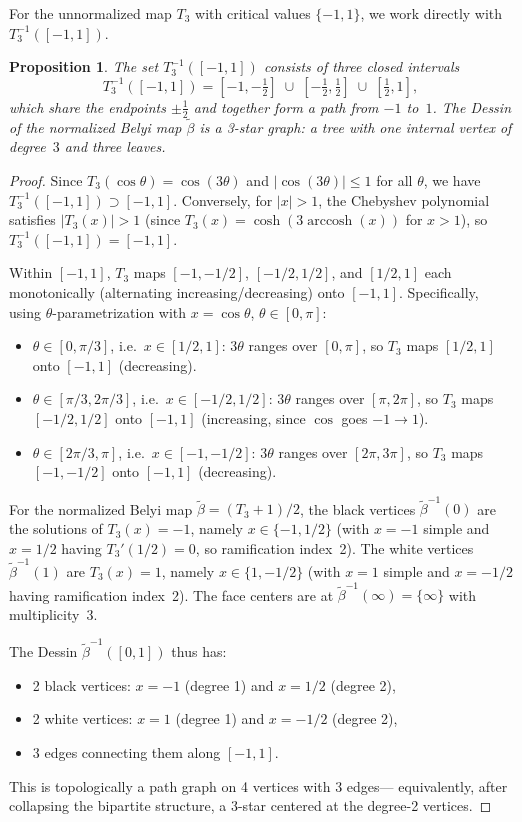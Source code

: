 \documentclass[12pt]{amsart}
\newtheorem{proposition}[theorem]{Proposition}
\theoremstyle{definition}
\theoremstyle{remark}
\begin{document}
For the unnormalized map $T_3$ with critical values $\{-1,1\}$, we
work directly with $T_3^{-1}([-1,1])$.

\begin{proposition}\label{prop:dessin-T3}
The set $T_3^{-1}([-1,1])$ consists of three closed intervals
\[
  T_3^{-1}([-1,1]) = [-1, -\tfrac{1}{2}] \;\cup\; [-\tfrac{1}{2}, \tfrac{1}{2}]
                      \;\cup\; [\tfrac{1}{2}, 1],
\]
which share the endpoints $\pm\tfrac{1}{2}$ and together form a path
from $-1$ to~$1$.  The Dessin of the normalized Belyi map $\tilde{\beta}$
is a 3-star graph: a tree with one internal vertex of degree~$3$ and
three leaves.
\end{proposition}

\begin{proof}
Since $T_3(\cos\theta) = \cos(3\theta)$ and $|\cos(3\theta)|\le 1$ for
all $\theta$, we have $T_3^{-1}([-1,1]) \supset [-1,1]$.  Conversely,
for $|x|>1$, the Chebyshev polynomial satisfies $|T_3(x)|>1$ (since
$T_3(x) = \cosh(3\operatorname{arccosh}(x))$ for $x>1$), so
$T_3^{-1}([-1,1]) = [-1,1]$.

Within $[-1,1]$, $T_3$ maps $[-1,-1/2]$, $[-1/2,1/2]$, and $[1/2,1]$
each monotonically (alternating increasing/decreasing) onto $[-1,1]$.
Specifically, using $\theta$-parametrization with $x=\cos\theta$,
$\theta\in[0,\pi]$:
\begin{itemize}
  \item $\theta\in[0,\pi/3]$, i.e.\ $x\in[1/2,1]$:
        $3\theta$ ranges over $[0,\pi]$, so $T_3$ maps $[1/2,1]$
        onto $[-1,1]$ (decreasing).
  \item $\theta\in[\pi/3,2\pi/3]$, i.e.\ $x\in[-1/2,1/2]$:
        $3\theta$ ranges over $[\pi,2\pi]$, so $T_3$ maps $[-1/2,1/2]$
        onto $[-1,1]$ (increasing, since $\cos$ goes $-1\to 1$).
  \item $\theta\in[2\pi/3,\pi]$, i.e.\ $x\in[-1,-1/2]$:
        $3\theta$ ranges over $[2\pi,3\pi]$, so $T_3$ maps $[-1,-1/2]$
        onto $[-1,1]$ (decreasing).
\end{itemize}

For the normalized Belyi map $\tilde{\beta}=(T_3+1)/2$, the black
vertices $\tilde{\beta}^{-1}(0)$ are the solutions of $T_3(x)=-1$,
namely $x\in\{-1, 1/2\}$ (with $x=-1$ simple and $x=1/2$ having
$T_3'(1/2)=0$, so ramification index~2).  The white vertices
$\tilde{\beta}^{-1}(1)$ are $T_3(x)=1$, namely $x\in\{1,-1/2\}$
(with $x=1$ simple and $x=-1/2$ having ramification index~2).
The face centers are at $\tilde\beta^{-1}(\infty) = \{\infty\}$
with multiplicity~3.

The Dessin $\tilde{\beta}^{-1}([0,1])$ thus has:
\begin{itemize}
  \item 2 black vertices: $x=-1$ (degree 1) and $x=1/2$ (degree 2),
  \item 2 white vertices: $x=1$ (degree 1) and $x=-1/2$ (degree 2),
  \item 3 edges connecting them along $[-1,1]$.
\end{itemize}
This is topologically a path graph on 4 vertices with 3 edges---
equivalently, after collapsing the bipartite structure, a 3-star centered
at the degree-2 vertices.
\end{proof}
\end{document}
